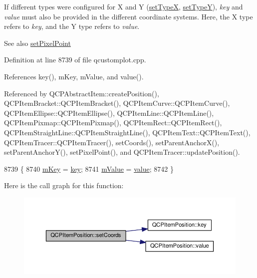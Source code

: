 If different types were configured for X and Y (\hyperlink{class_q_c_p_item_position_a2113b2351d6d00457fb3559a4e20c3ea}{set\+Type\+X}, \hyperlink{class_q_c_p_item_position_ac2a454aa5a54c1615c50686601ec4510}{set\+Type\+Y}), {\itshape key} and {\itshape value} must also be provided in the different coordinate systems. Here, the X type refers to {\itshape key}, and the Y type refers to {\itshape value}.

\begin{DoxySeeAlso}{See also}
\hyperlink{class_q_c_p_item_position_ab404e56d9ac2ac2df0382c57933a71ef}{set\+Pixel\+Point} 
\end{DoxySeeAlso}


Definition at line 8739 of file qcustomplot.\+cpp.



References key(), m\+Key, m\+Value, and value().



Referenced by Q\+C\+P\+Abstract\+Item\+::create\+Position(), Q\+C\+P\+Item\+Bracket\+::\+Q\+C\+P\+Item\+Bracket(), Q\+C\+P\+Item\+Curve\+::\+Q\+C\+P\+Item\+Curve(), Q\+C\+P\+Item\+Ellipse\+::\+Q\+C\+P\+Item\+Ellipse(), Q\+C\+P\+Item\+Line\+::\+Q\+C\+P\+Item\+Line(), Q\+C\+P\+Item\+Pixmap\+::\+Q\+C\+P\+Item\+Pixmap(), Q\+C\+P\+Item\+Rect\+::\+Q\+C\+P\+Item\+Rect(), Q\+C\+P\+Item\+Straight\+Line\+::\+Q\+C\+P\+Item\+Straight\+Line(), Q\+C\+P\+Item\+Text\+::\+Q\+C\+P\+Item\+Text(), Q\+C\+P\+Item\+Tracer\+::\+Q\+C\+P\+Item\+Tracer(), set\+Coords(), set\+Parent\+Anchor\+X(), set\+Parent\+Anchor\+Y(), set\+Pixel\+Point(), and Q\+C\+P\+Item\+Tracer\+::update\+Position().


\begin{DoxyCode}
8739                                                         \{
8740   \hyperlink{class_q_c_p_item_position_a4ff3931ad115603dfb4c7000b24bb415}{mKey} = \hyperlink{class_q_c_p_item_position_ac3cb2bddf5f89e5181830be30b93d090}{key};
8741   \hyperlink{class_q_c_p_item_position_a67bf5df69f587d53731724a7d61c6c3f}{mValue} = \hyperlink{class_q_c_p_item_position_a6817f7356d3a2b63e8446c6b6106dae1}{value};
8742 \}
\end{DoxyCode}


Here is the call graph for this function\+:\nopagebreak
\begin{figure}[H]
\begin{center}
\leavevmode
\includegraphics[width=350pt]{class_q_c_p_item_position_aa988ba4e87ab684c9021017dcaba945f_cgraph}
\end{center}
\end{figure}




